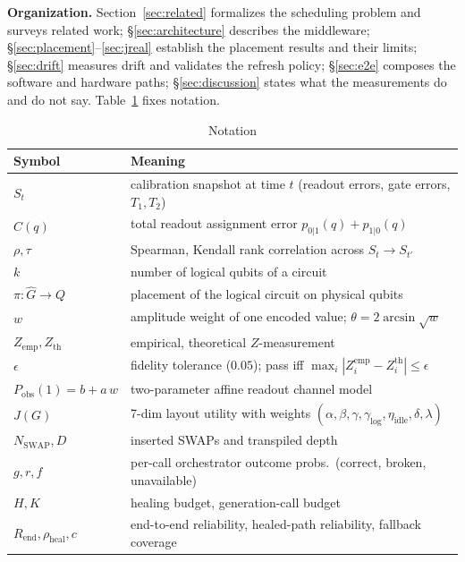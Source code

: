 \documentclass[journal,10pt,twocolumn]{IEEEtran}
\begin{document}
\noindent\textbf{Organization.} Section~\ref{sec:related} formalizes the scheduling problem and surveys related
work; \S\ref{sec:architecture} describes the middleware; \S\ref{sec:placement}--\ref{sec:jreal} establish the
placement results and their limits; \S\ref{sec:drift} measures drift and validates the refresh policy;
\S\ref{sec:e2e} composes the software and hardware paths; \S\ref{sec:discussion} states what the measurements do
and do not say. Table~\ref{tab:notation} fixes notation.

\begin{table}[t]
\caption{Notation}
\label{tab:notation}
\centering
\small
\renewcommand{\arraystretch}{1.15}
\begin{tabular}{@{}lp{5.8cm}@{}}
\toprule
Symbol & Meaning\\
\midrule
$S_t$ & calibration snapshot at time $t$ (readout errors, gate errors, $T_1,T_2$)\\
$C(q)$ & total readout assignment error $p_{0|1}(q)+p_{1|0}(q)$\\
$\rho,\tau$ & Spearman, Kendall rank correlation across $S_t\to S_{t'}$\\
$k$ & number of logical qubits of a circuit\\
$\pi:\hat{G}\to Q$ & placement of the logical circuit on physical qubits\\
$w$ & amplitude weight of one encoded value; $\theta=2\arcsin\sqrt{w}$\\
$Z_{\mathrm{emp}},Z_{\mathrm{th}}$ & empirical, theoretical $Z$-measurement\\
$\epsilon$ & fidelity tolerance ($0.05$); pass iff $\max_i|Z_i^{\mathrm{emp}}-Z_i^{\mathrm{th}}|\le\epsilon$\\
$P_{\mathrm{obs}}(1)=b+a\,w$ & two-parameter affine readout channel model\\
$J(G)$ & 7-dim layout utility with weights $(\alpha,\beta,\gamma,\gamma_{\log},\eta_{\mathrm{idle}},\delta,\lambda)$\\
$N_{\mathrm{SWAP}},D$ & inserted SWAPs and transpiled depth\\
$g,r,f$ & per-call orchestrator outcome probs.\ (correct, broken, unavailable)\\
$H,K$ & healing budget, generation-call budget\\
$R_{\mathrm{end}},\rho_{\mathrm{heal}},c$ & end-to-end reliability, healed-path reliability, fallback coverage\\
\bottomrule
\end{tabular}
\end{table}
\end{document}
